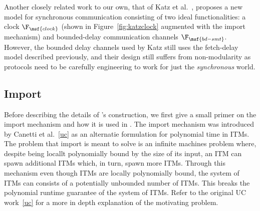 Another closely related work to our own, that of Katz et al.~\cite{katzuc}, proposes a new model for synchronous communication consisting of two ideal functionalities: a clock $\F_{\msf{clock}}$ (shown in Figure~\ref{fig:katzclock} augmented with the import mechanism) and bounded-delay communication channels $\F_{\msf{bd-smt}}$.
However, the bounded delay channels used by Katz still uses the fetch-delay model described previously, and their design still suffers from non-modularity as protocols need to be carefully engineering to work for just the \textit{synchronous} world.

%

%



\subsection{Import}
Before describing the details of \Wasync's construction, we first give a small primer on the import mechanism and how it is used in \Wasync.
The import mechanism was introduced by Canetti et al.~\ref{uc} as an alternatie formulation for polynomial time in ITMs.
The problem that import is meant to solve is an infinite machines problem where, despite being locallt polynomially bound by the size of its input, an ITM can spawn additional ITMs which, in turn, spawn more ITMs.
Through this mechanism even though ITMs are locally polynomially bound, the system of ITMs can consists of a potentially unbounded number of ITMs. 
This breaks the polynomial runtime guarantee of the system of ITMs. 
Refer to the original UC work~\ref{uc} for a more in depth explanation of the motivating problem.

